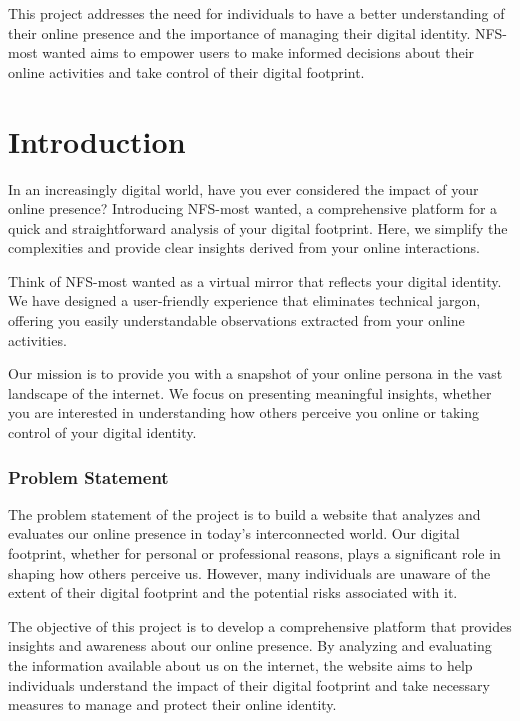 \documentclass[openany]{report}
\begin{document}
This project addresses the need for individuals to have a better understanding of their online presence and the importance of managing their digital identity. NFS-most wanted aims to empower users to make informed decisions about their online activities and take control of their digital footprint.

\thispagestyle{empty}
\clearpage

\listoffigures
\clearpage
\setcounter{page}{1}

\chapter{Introduction}

In an increasingly digital world, have you ever considered the impact of your online presence? Introducing NFS-most wanted, a comprehensive platform for a quick and straightforward analysis of your digital footprint. Here, we simplify the complexities and provide clear insights derived from your online interactions.

Think of NFS-most wanted as a virtual mirror that reflects your digital identity. We have designed a user-friendly experience that eliminates technical jargon, offering you easily understandable observations extracted from your online activities.

Our mission is to provide you with a snapshot of your online persona in the vast landscape of the internet. We focus on presenting meaningful insights, whether you are interested in understanding how others perceive you online or taking control of your digital identity.


\subsection{Problem Statement}
The problem statement of the project is to build a website that analyzes and evaluates our online presence in today's interconnected world. Our digital footprint, whether for personal or professional reasons, plays a significant role in shaping how others perceive us. However, many individuals are unaware of the extent of their digital footprint and the potential risks associated with it.

The objective of this project is to develop a comprehensive platform that provides insights and awareness about our online presence. By analyzing and evaluating the information available about us on the internet, the website aims to help individuals understand the impact of their digital footprint and take necessary measures to manage and protect their online identity.
\end{document}
